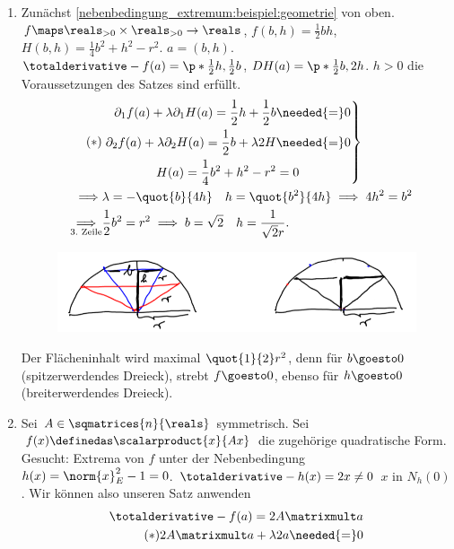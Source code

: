 \begin{beispiele*}
  \begin{enumerate}
    \item Zunächst \ref{nebenbedingung_extremum:beispiel:geometrie} von oben. \( f\maps \reals_{>0}\times \reals_{>0}\to \reals \), \( f(b,h)=\frac{1}{2}bh \), \( H(b,h)=\frac{1}{4}b^2+h^2-r^2 \). \( a=(b,h) \). \( \totalderivative-{f}(a)=\p*{ \frac{1}{2}h,\frac{1}{2}b } \), \( DH(a)=\p*{ \frac{1}{2}b, 2h } \). \( h>0 \) \timplies die Voraussetzungen des Satzes sind erfüllt.
    \begin{align*}
      \tag{\(*\)}&\left.\begin{aligned}
        \partial_1 f(a)+\lambda \partial_1 H(a)=\frac{1}{2}h+\frac{1}{2}b&\needed{=}0\\
        \partial_2 f(a)+\lambda\partial_2 H(a)=\frac{1}{2}b+\lambda 2H&\needed{=}0\\
        H(a)=\frac{1}{4}b^2+h^2-r^2&=0
      \end{aligned}\right\}\\
      \implies &\lambda=-\quot{b}{4h}\quad h=\quot{b^2}{4h} \implies 4h^2=b^2\\
      \underset{\text{3.\ Zeile}}{\implies} &\frac{1}{2}b^2=r^2\implies b=\sqrt{2}\quad h=\frac{1}{\sqrt{2}r}.
    \end{align*}
    \begin{figure}[H]
      \centering
      \includegraphics[width=0.5\linewidth]{figures/dreiecksmaximierung_antwort}
      \caption*{}
      \label{fig:dreiecksmaximierung_antwort}
    \end{figure}
    Der Flächeninhalt wird maximal \( \quot{1}{2}r^2 \), denn für \( b\goesto 0 \) (spitzerwerdendes Dreieck), strebt \( f\goesto 0 \), ebenso für \( h\goesto 0 \) (breiterwerdendes Dreieck).
    \item Sei \( A\in \sqmatrices{n}{\reals} \) symmetrisch. Sei \( f(x)\definedas \scalarproduct{x}{Ax} \) die zugehörige quadratische Form. Gesucht: Extrema von \( f \) unter der Nebenbedingung \( h(x)=\norm{x}_E^2-1=0 \). \( \totalderivative-{h}(x)=2x\neq 0 \) \tforall \( x \) in \( N_h(0) \). Wir können also unseren Satz anwenden
    \begin{align*}
      \totalderivative-{f}(a)=2A\matrixmult a\\
      \tag{\(*\)} 2A\matrixmult a+\lambda 2a\needed{=}0

\end{align*}
\end{enumerate}
\end{beispiele*}
